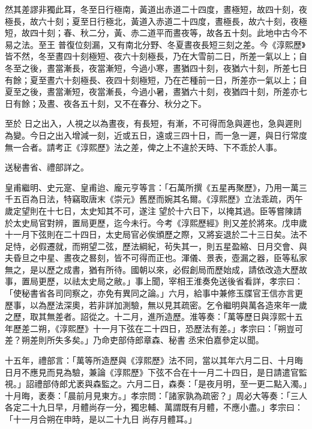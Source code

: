 \begin{pinyinscope}
 然其差謬非獨此耳，冬至日行極南，黃道出赤道二十四度，晝極短，故四十刻，夜極長，故六十刻；夏至日行極北，黃道入赤道二十四度，晝極長，故六十刻，夜極短，故四十刻；春、秋二分，黃、赤二道平而晝夜等，故各五十刻。此地中古今不易之法。至王
 普復位刻漏，又有南北分野、冬夏晝夜長短三刻之差。今《淳熙歷》皆不然，冬至晝四十刻極短、夜六十刻極長，乃在大雪前二日，所差一氣以上；自冬至之後，晝當漸長，夜當漸短，今過小寒，晝猶四十刻，夜猶六十刻，所差七日有餘；夏至晝六十刻極長、夜四十刻極短，乃在芒種前一日，所差亦一氣以上；自夏至之後，晝當漸短，夜當漸長，今過小暑，晝猶六十刻，夜猶四十刻，所差亦七日有餘；及晝、夜各五十刻，又不在春分、秋分之下。



 至於
 日之出入，人視之以為晝夜，有長短，有漸，不可得而急與遲也，急與遲則為變。今日之出入增減一刻，近或五日，遠或三四十日，而一急一遲，與日行常度無一合者。請考正《淳熙歷》法之差，俾之上不違於天時、下不乖於人事。



 送秘書省、禮部詳之。



 皇甫繼明、史元寔、皇甫迨、龐元亨等言：「石萬所撰《五星再聚歷》，乃用一萬三千五百為日法，特竊取唐末《崇元》舊歷而婉其名爾。《淳熙歷》立法乖疏，丙午歲定望則在十七日，太史知其不可，遂注
 望於十六日下，以掩其過。臣等嘗陳請於太史局官對辨，置局更歷，迄今未行。今考《淳熙歷經》則又差於將來。戊申歲十一月下弦則在二十四日，太史局官必俟頒歷之際，又將妄退於二十三日矣。法不足恃，必假遷就，而朔望二弦，歷法綱紀，茍失其一，則五星盈縮、日月交會、與夫昏旦之中星、晝夜之晷刻，皆不可得而正也。渾儀、景表，壺漏之器，臣等私家無之，是以歷之成書，猶有所待。國朝以來，必假創局而歷始成，請依改造大歷故
 事，置局更歷，以祛太史局之敝。」事上聞，宰相王淮奏免送後省看詳，孝宗曰：「使秘書省各司同察之，亦免有異同之論。」六月，給事中兼修玉牒官王信亦言更歷事，以為歷法深奧，若非詳加測驗，無以見其疏密。乞令繼明與萬各造來年一歲之歷，取其無差者。詔從之。十二月，進所造歷。淮等奏：「萬等歷日與淳熙十五年歷差二朔，《淳熙歷》十一月下弦在二十四日，恐歷法有差。」孝宗曰：「朔豈可差？朔差則所失多矣。」乃命吏部侍郎章森、秘書
 丞宋伯嘉參定以聞。



 十五年，禮部言：「萬等所造歷與《淳熙歷》法不同，當以其年六月二日、十月晦日月不應見而見為驗，兼論《淳熙歷》下弦不合在十一月二十四日，是日請遣官監視。」詔禮部侍郎尤袤與森監之。六月二日，森奏：「是夜月明，至一更二點入濁。」十月晦，袤奏：「晨前月見東方。」孝宗問：「諸家孰為疏密？」周必大等奏：「三人各定二十九日早，月體尚存一分，獨忠輔、萬謂既有月體，不應小盡。」孝宗曰：「十一月合朔在申時，是以二十九日
 尚存月體耳。」




\end{pinyinscope}
